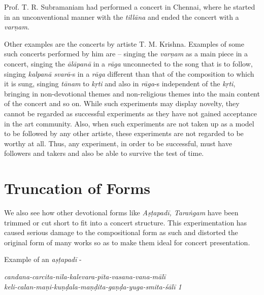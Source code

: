 Prof. T. R. Subramaniam had performed a concert in Chennai, where he started in an unconventional manner with the \textit{tillāna} and ended the concert with a \textit{varṇam}.

Other examples are the concerts by artiste T. M. Krishna. Examples of some such concerts performed by him are – singing the \textit{varṇam} as a main piece in a concert, singing the \textit{ālāpanā} in a \textit{rāga} unconnected to the song that is to follow, singing \textit{kalpanā svarā}-s in a \textit{rāga} different than that of the composition to which it is sung, singing \textit{tānam} to \textit{kṛti} and also in \textit{rāga}-s independent of the \textit{kṛti}, bringing in non-devotional themes and non-religious themes into the main content of the concert and so on. While such experiments may display novelty, they cannot be regarded as successful experiments as they have not gained acceptance in the art community. Also, when such experiments are not taken up as a model to be followed by any other artiste, these experiments are not regarded to be worthy at all. Thus, any experiment, in order to be successful, must have followers and takers and also be able to survive the test of time.


\section*{Truncation of Forms}

We also see how other devotional forms like \textit{Aṣṭapadī, Taraṅgam} have been trimmed or cut short to fit into a concert structure. This experimentation has caused serious damage to the compositional form as such and distorted the original form of many works so as to make them ideal for concert presentation.

Example of an \textit{aṣṭapadī} -

\begin{myquote}
\textit{candana-carcita-nīla-kalevara-pīta-vasana-vana-mālī }\\\textit{keli-calan-maṇi-kuṇḍala-maṇḍita-gaṇḍa-yuga-smita-śālī 1 }
\end{myquote}

